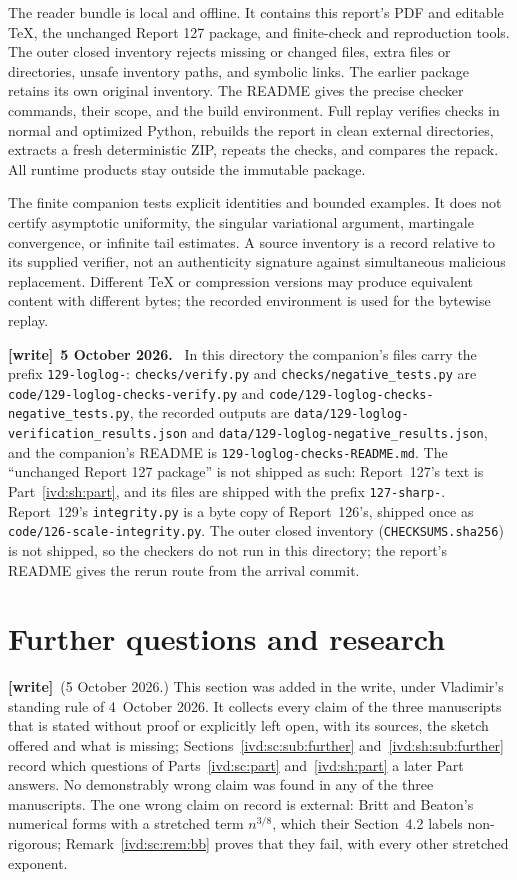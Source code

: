 \documentclass[11pt,letterpaper]{article}
\theoremstyle{remark}\newtheorem{remark}[theorem]{Remark}
\numberwithin{equation}{section}
\newcommand{\file}[1]{\nolinkurl{#1}}
\newenvironment{writenote}[1][]{\par\smallskip\begingroup\small
 \noindent\textbf{[write]}\if\relax\detokenize{#1}\relax\else~\textbf{#1.}\fi\ }%
 {\par\endgroup\smallskip}
\newcommand{\wtag}{\textup{\textbf{[write]}}}
\begin{document}
The reader bundle is local and offline. It contains this report's
PDF and editable TeX, the unchanged Report 127 package, and finite-check and reproduction tools.
The outer closed inventory rejects missing or changed files, extra
files or directories, unsafe inventory paths, and symbolic links.
The earlier package retains its own original inventory.
The README gives the precise checker commands, their scope, and
the build environment. Full replay verifies checks in normal and
optimized Python, rebuilds the report in clean external directories,
extracts a fresh deterministic ZIP, repeats the checks, and compares
the repack. All runtime products stay outside the immutable package.

The finite companion tests explicit identities and bounded examples.
It does not certify asymptotic uniformity, the singular variational
argument, martingale convergence, or infinite tail estimates.
A source inventory is a record relative to its supplied verifier,
not an authenticity signature against simultaneous malicious
replacement. Different TeX or compression versions may produce
equivalent content with different bytes; the recorded environment
is used for the bytewise replay.
\begin{writenote}[5 October 2026]
In this directory the companion's files carry the prefix \file{129-loglog-}: \file{checks/verify.py} and \file{checks/negative_tests.py} are \file{code/129-loglog-checks-verify.py} and \file{code/129-loglog-checks-negative_tests.py}, the recorded outputs are \file{data/129-loglog-verification_results.json} and \file{data/129-loglog-negative_results.json}, and the companion's README is \file{129-loglog-checks-README.md}. The ``unchanged Report 127 package'' is not shipped as such: Report~127's text is Part~\ref{ivd:sh:part}, and its files are shipped with the prefix \file{127-sharp-}. Report~129's \file{integrity.py} is a byte copy of Report~126's, shipped once as \file{code/126-scale-integrity.py}. The outer closed inventory (\file{CHECKSUMS.sha256}) is not shipped, so the checkers do not run in this directory; the report's README gives the rerun route from the arrival commit.
\end{writenote}

\section{Further questions and research}\label{ivd:ll:sec:further}
\wtag\ (5 October 2026.) This section was added in the write, under Vladimir's standing rule of 4~October 2026. It collects every claim of the three manuscripts that is stated without proof or explicitly left open, with its sources, the sketch offered and what is missing; Sections~\ref{ivd:sc:sub:further} and~\ref{ivd:sh:sub:further} record which questions of Parts~\ref{ivd:sc:part} and~\ref{ivd:sh:part} a later Part answers. No demonstrably wrong claim was found in any of the three manuscripts. The one wrong claim on record is external: Britt and Beaton's numerical forms with a stretched term $n^{3/8}$, which their Section~4.2 labels non-rigorous; Remark~\ref{ivd:sc:rem:bb} proves that they fail, with every other stretched exponent.
\end{document}
